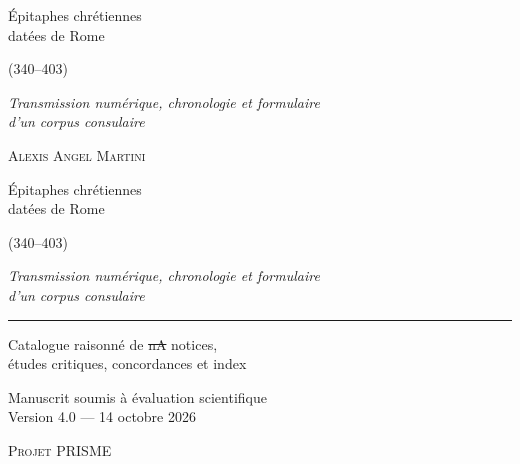 \thispagestyle{empty}
\begin{center}
\vspace*{38mm}
{\displayfont\Huge Épitaphes chrétiennes\\[2mm] datées de Rome\\[4mm]}
{\displayfont\Large (340–403)\par}
\vspace{10mm}
{\large\itshape Transmission numérique, chronologie et formulaire\\ d’un corpus consulaire\par}
\vfill
\end{center}
\cleardoublepage

\thispagestyle{empty}
\begin{center}
\vspace*{20mm}
{\large\scshape Alexis Angel Martini\par}
\vspace{22mm}
{\displayfont\Huge Épitaphes chrétiennes\\[2mm] datées de Rome\\[4mm]}
{\displayfont\Large (340–403)\par}
\vspace{10mm}
{\large\itshape Transmission numérique, chronologie et formulaire\\ d’un corpus consulaire\par}
\vspace{18mm}
{\color{prismered}\rule{40mm}{0.4pt}}\par
\vspace{6mm}
{\normalsize Catalogue raisonné de \st{nA} notices,\\ études critiques, concordances et index\par}
\vfill
{\small Manuscrit soumis à évaluation scientifique\\ Version 4.0 — 14 octobre 2026\par}
\vspace{6mm}
{\small\scshape Projet PRISME\par}
\end{center}
\clearpage

